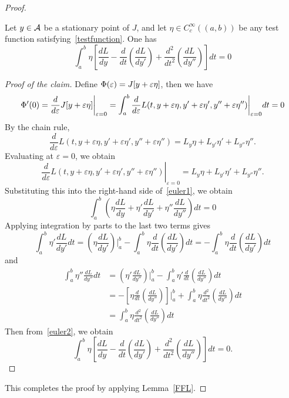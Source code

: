 ﻿\documentclass[12pt]{article}
\begin{document}
\begin{proof}
    \begin{claim}Let $y \in \mathcal{A}$ be a stationary point of $J$, and let $\eta \in C_c^\infty((a, b))$ be any test function satisfying~\eqref{testfunction}. One has 
            \[ \int_a^b \eta\left[\frac{dL}{dy} - \frac{d}{dt}\left(\frac{dL}{dy'}\right) + \frac{d^2}{dt^2}\left(\frac{dL}{dy''}\right)\right] dt = 0
 \]
    \end{claim}
    \begin{proof}[Proof of the claim] Define $\Phi(\varepsilon) = J[y + \varepsilon\eta]$, then we have 
    \begin{equation}\label{euler1}
 \Phi'(0) = \frac{d}{d\varepsilon}J[y + \varepsilon\eta]\bigg|_{\varepsilon = 0} = \int_a^b \frac{d}{d\varepsilon} L(t, y + \varepsilon\eta, y' + \varepsilon\eta', y'' + \varepsilon\eta'')\bigg|_{\varepsilon = 0}dt = 0
 \end{equation}
    By the chain rule,
    \[
 \frac{d}{d\varepsilon} L(t, y + \varepsilon\eta, y' + \varepsilon\eta', y'' + \varepsilon\eta'') = L_y\eta + L_{y'}\eta' + L_{y''}\eta''.
 \]
    Evaluating at $\varepsilon = 0$, we obtain
    \[
 \left. \frac{d}{d\varepsilon} L(t, y + \varepsilon\eta, y' + \varepsilon\eta', y'' + \varepsilon\eta'') \right|_{\varepsilon = 0} = L_y\eta + L_{y'}\eta' + L_{y''}\eta''.
 \]
     Substituting this into the right-hand side of~\eqref{euler1}, we obtain 
    \begin{equation}\label{euler2} \int_a^b \left( \eta\frac{dL}{dy} + \eta'\frac{dL}{dy'} + \eta''\frac{dL}{dy''}\right)dt = 0
 \end{equation}
    Applying integration by parts to the last two terms gives
    \[ \int_a^b \eta'\frac{dL}{dy'} dt = \left( \eta \frac{dL}{dy'}\right)\bigg|_a^b - \int_a^b \eta \frac{d}{dt}\left(\frac{dL}{dy'}\right)dt = - \int_a^b \eta \frac{d}{dt}\left(\frac{dL}{dy'}\right)dt
 \]
    and 
    \begin{align*} \int_a^b \eta'' \frac{dL}{dy''}dt & = \left( \eta' \frac{dL}{dy''}\right)\bigg|_a^b - \int_a^b \eta' \frac{d}{dt}\left(\frac{dL}{dy''}\right)dt\\
 & = -\left[ \eta \frac{d}{dt}\left(\frac{dL}{dy''}\right)\right]\bigg|_a^b + \int_a^b \eta \frac{d^2}{dt^2}\left(\frac{dL}{dy''}\right)dt\\
 & = \int_a^b \eta \frac{d^2}{dt^2}\left(\frac{dL}{dy''}\right)dt
 \end{align*}
    Then from~\eqref{euler2}, we obtain 
    \[ \int_a^b \eta\left[\frac{dL}{dy} - \frac{d}{dt}\left(\frac{dL}{dy'}\right) + \frac{d^2}{dt^2}\left(\frac{dL}{dy''}\right)\right] dt = 0.
 \]
    \end{proof}
    This completes the proof by applying Lemma~\ref{FFL}.
\end{proof}
\end{document}

